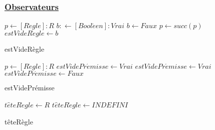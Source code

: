 \documentclass{article}
\begin{document}
\subsubsection{\underline{Observateurs}}
\begin{algorithm}
    \SetAlgoLined
    \KwResult{[Booléen]}
    
    \begin{algorithmic}
    
        \STATE $p \gets [R\grave{e}gle] : R$
        \STATE $b : \gets [Bool\acute{e}en] : Vrai$
                \STATE $b \gets Faux$
            \ENDIF
            \STATE $p \gets succ(p)$
        \ENDWHILE
        \STATE $estVideR\grave{e}gle \gets b$
    
    \end{algorithmic}
    \caption{estVideRègle} 
\end{algorithm}
\clearpage
\begin{algorithm}
    \SetAlgoLined
    \KwResult{[booléen]}
    
    \begin{algorithmic}
        \STATE $p \gets [R\grave{e}gle] : R$
            \STATE $estVidePr\acute{e}misse \gets Vrai$
        \ELSE
                \STATE $estVidePr\acute{e}misse \gets Vrai$
            \ELSE
                \STATE $estVidePr\acute{e}misse \gets Faux$
            \ENDIF
        \ENDIF
      
    \end{algorithmic}
    \caption{estVidePrémisse} 
\end{algorithm}

\begin{algorithm}
    \SetAlgoLined
    \KwResult{[Proposition]}
    
    \begin{algorithmic}
            \STATE $t\hat{e}teR\grave{e}gle \gets R$
        \ELSE
            \STATE $t\hat{e}teR\grave{e}gle \gets INDEFINI$
        \ENDIF
      
    \end{algorithmic}
    \caption{têteRègle} 
\end{algorithm}
\end{document}
